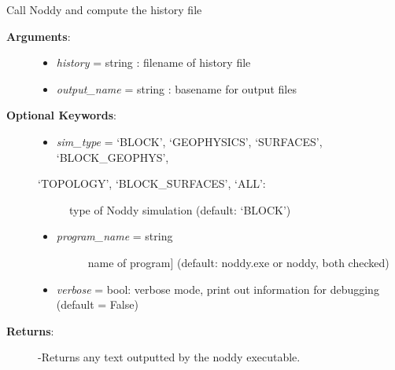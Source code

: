 \documentclass[a4paper,10pt,english]{sphinxmanual}
\begin{document}
\begin{fulllineitems}
\label{pynoddy:pynoddy.compute_model}
Call Noddy and compute the history file
\begin{description}
\item[{\textbf{Arguments}:}] \leavevmode\begin{itemize}
\item {} 
\emph{history} = string : filename of history file

\item {} 
\emph{output\_name} = string : basename for output files

\end{itemize}

\item[{\textbf{Optional Keywords}:}] \leavevmode\begin{itemize}
\item {} 
\emph{sim\_type} = `BLOCK', `GEOPHYSICS', `SURFACES', `BLOCK\_GEOPHYS',

\end{itemize}
\begin{description}
\item[{`TOPOLOGY', `BLOCK\_SURFACES', `ALL':}] \leavevmode
type of Noddy simulation (default: `BLOCK')

\end{description}
\begin{itemize}
\item {} \begin{description}
\item[{\emph{program\_name} = string}] \leavevmode{[}name of program{]}
(default: noddy.exe or noddy, both checked)

\end{description}

\item {} 
\emph{verbose} = bool: verbose mode, print out information for debugging (default = False)

\end{itemize}

\item[{\textbf{Returns}:}] \leavevmode
-Returns any text outputted by the noddy executable.

\end{description}

\end{fulllineitems}
\end{document}
